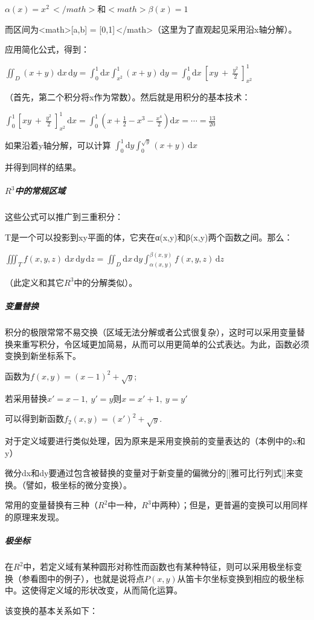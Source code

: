 \documentclass[UTF-8]{ctexart}
\begin{document}
$\alpha (x) = x^2\,\!</math> 和 <math>\beta (x) = 1\,\!$

而区间为<math>[a,b] = [0,1]\,\!</math>（这里为了直观起见采用沿x轴分解）。

应用简化公式，得到：

$\iint_D (x+y) \, \mathrm{d}x \, \mathrm{d}y = \int_0^1 \mathrm{d}x \int_{x^2}^1 (x+y) \, \mathrm{d}y = \int_0^1 \mathrm{d}x \ \left[xy \ + \ \frac{y^2}{2} \ \right]^1_{x^2}$

（首先，第二个积分将x作为常数）。然后就是用积分的基本技术：

$\int_0^1 \left[xy \ + \ \frac{y^2}{2} \ \right]^1_{x^2} \, \mathrm{d}x = \int_0^1 \left(x + \frac{1}{2} - x^3 - \frac{x^4}{2} \right) \mathrm{d}x = \cdots = \frac{13}{20}$

如果沿着y轴分解，可以计算
$\int_0^1 \mathrm{d}y \int_0^{\sqrt{y}} (x+y) \, \mathrm{d}x$

并得到同样的结果。
\subparagraph{$R^3$中的常规区域}
这些公式可以推广到三重积分：

T是一个可以投影到xy平面的体，它夹在α(x,y)和β(x,y)两个函数之间。那么：

$\iiint_T f(x,y,z) \ \mathrm{d}x\, \mathrm{d}y\, \mathrm{d}z = \iint_D \mathrm{d}x\, \mathrm{d}y \int_{\alpha (x,y)}^{\beta (x,y)} f(x,y,z) \, \mathrm{d}z$

（此定义和其它$R^3$中的分解类似）。

\subparagraph{变量替换}
积分的极限常常不易交换（区域无法分解或者公式很复杂），这时可以采用变量替换来重写积分，令区域更加简易，从而可以用更简单的公式表达。为此，函数必须变换到新坐标系下。

函数为$f(x, y) = (x-1)^2 +\sqrt y$;

若采用替换$x' = x-1, \ y'= y $则$x = x' + 1, \ y=y' $

可以得到新函数$f_2(x,y) = (x')^2 +\sqrt y$.

对于定义域要进行类似处理，因为原来是采用变换前的变量表达的（本例中的x和y）

微分dx和dy要通过包含被替换的变量对于新变量的偏微分的[[雅可比行列式]]来变换。（譬如，极坐标的微分变换）。

常用的变量替换有三种（$R^2$中一种，$R^3$中两种）；但是，更普遍的变换可以用同样的原理来发现。

\subparagraph{极坐标}
在$R^2$中，若定义域有某种圆形对称性而函数也有某种特征，则可以采用极坐标变换（参看图中的例子），也就是说将点$P(x,y)$从笛卡尔坐标变换到相应的极坐标中。这使得定义域的形状改变，从而简化运算。

该变换的基本关系如下：
\end{document}
